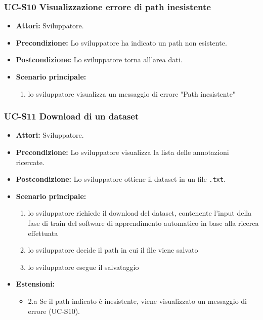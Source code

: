 \subsubsection{UC-S10 Visualizzazione errore di path inesistente}
		\begin{itemize}					
			\item \textbf{Attori:} Sviluppatore.
			\item \textbf{Precondizione:} Lo sviluppatore ha indicato un path non esistente.
			\item \textbf{Postcondizione:} Lo sviluppatore torna all'area dati.
			\item \textbf{Scenario principale:}
				\begin{enumerate}
					\item lo sviluppatore visualizza un messaggio di errore "Path inesistente"
				\end{enumerate}	
		\end{itemize}				
				
	\subsubsection{UC-S11 Download di un dataset}
		\begin{itemize}
			\item \textbf{Attori:} Sviluppatore.
			\item \textbf{Precondizione:} Lo sviluppatore visualizza la lista delle annotazioni ricercate.
			\item \textbf{Postcondizione:} Lo sviluppatore ottiene il dataset in un file \texttt{.txt}.
			\item \textbf{Scenario principale:}
			\begin{enumerate}
				\item lo sviluppatore richiede il download del dataset, contenente l'input della fase di train del software di apprendimento automatico in base alla ricerca effettuata
				\item lo sviluppatore decide il path in cui il file viene salvato
				\item lo sviluppatore esegue il salvataggio
			\end{enumerate}
			\item \textbf{Estensioni:}
				\begin{itemize}
					\item 2.a Se il path indicato è inesistente, viene visualizzato un messaggio di errore (UC-S10).
				\end{itemize}
		\end{itemize}
		
